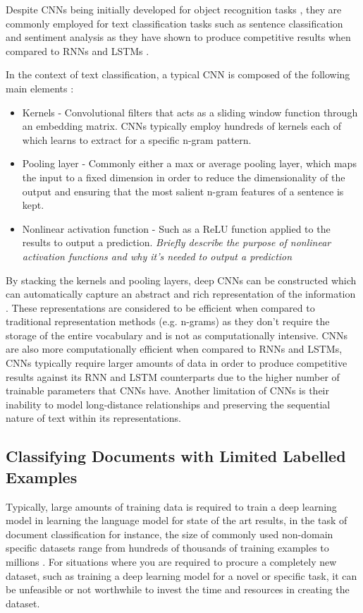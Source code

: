 \documentclass[a4paper,twoside,phd]{BYUPhys}
\begin{document}
Despite CNNs being initially developed for object recognition tasks \cite{LeCun1999}, they are commonly employed for text classification tasks such as sentence classification and sentiment analysis as they have shown to produce competitive results when compared to RNNs and LSTMs \cite{Collobert2011} \cite{Kim} \cite{Nogueira}. \newline

In the context of text classification, a typical CNN is composed of the following main elements \cite{Young}:

\begin{itemize}
	\item Kernels - Convolutional filters that acts as a sliding window function through an embedding matrix. CNNs typically employ hundreds of kernels each of which learns to extract for a specific n-gram pattern.
	\item Pooling layer - Commonly either a max or average pooling layer, which maps the input to a fixed dimension in order to reduce the dimensionality of the output and ensuring that the most salient n-gram features of a sentence is kept.
	\item Nonlinear activation function - Such as a ReLU function applied to the results to output a prediction. \textit{Briefly describe the purpose of nonlinear activation functions and why it's needed to output a prediction}
\end{itemize}

By stacking the kernels and pooling layers, deep CNNs can be constructed which can automatically capture an abstract and rich representation of the information \cite{Young}. These representations are considered to be efficient when compared to traditional representation methods (e.g. n-grams) as they don't require the storage of the entire vocabulary and is not as computationally intensive. CNNs are also more computationally efficient when compared to RNNs and LSTMs, CNNs typically require larger amounts of data in order to produce competitive results against its RNN and LSTM counterparts due to the higher number of trainable parameters that CNNs have. Another limitation of CNNs is their inability to model long-distance relationships and preserving the sequential nature of text within its representations.

\subsection{Classifying Documents with Limited Labelled Examples}
\label{sec:TransferLearning}
Typically, large amounts of training data is required to train a deep learning model in learning the language model for state of the art results, in the task of document classification for instance, the size of commonly used non-domain specific datasets range from hundreds of thousands of training examples to millions \cite{Conneau2017} \cite{Zhang}. For situations where you are required to procure a completely new dataset, such as training a deep learning model for a novel or specific task, it can be unfeasible  or not worthwhile to invest the time and resources in creating the dataset. 
\end{document}
